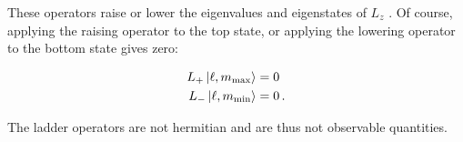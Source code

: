 \documentclass[12pt, titlepage]{article}
\begin{document}

These operators raise or lower the eigenvalues and eigenstates of $L_{z}$ . Of course, applying the raising operator to the top state, or applying the lowering operator to the bottom state gives zero:

\begin{subequations}
\begin{align}
	L_{+}\ket{\ell, m_{\text{max}}} &= 0 \\
	L_{-}\ket{\ell, m_{\text{min}}} &= 0 \, .
\end{align}
\end{subequations}

The ladder operators are not hermitian and are thus not observable quantities.
 
\end{document}
